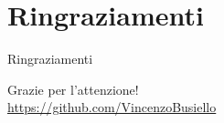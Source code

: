 \documentclass{beamer} %
\begin{document}
\section{Ringraziamenti}
        \begin{frame}{Ringraziamenti}
            \begin{center}
                {\huge Grazie per l'attenzione!}\\
                \bigskip
                \bigskip
                \bigskip
                \bigskip
                \bigskip
                \bigskip
                \bigskip
                \bigskip
                \url{https://github.com/VincenzoBusiello}
            \end{center}
        \end{frame}
\end{document}
